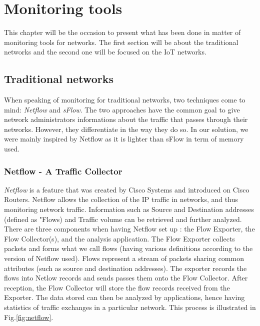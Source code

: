 
\chapter{Monitoring tools}

This chapter will be the occasion to present what has been done in matter of monitoring tools for networks. The first section will be about the traditional networks and the second one will be focused on the IoT networks.

\section{Traditional networks}

When speaking of monitoring for traditional networks, two techniques come to mind: \textit{Netflow} and \textit{sFlow}. The two approaches have the common goal to give network administrators informations about the traffic that passes through their networks. However, they differentiate in the way they do so. In our solution, we were mainly inspired by Netflow as it is lighter than sFlow in term of memory used.

\subsection{Netflow - A Traffic Collector}

\textit{Netflow} is a feature that was created by Cisco Systems and introduced on Cisco Routers. Netflow allows the collection of the IP traffic in networks, and thus monitoring network traffic. Information such as Source and Destination addresses (defined as "Flows) and Traffic volume can be retrieved and further analyzed.\\

There are three components when having Netflow set up : the Flow Exporter, the Flow Collector(s), and the analysis application. The Flow Exporter collects packets and forms what we call flows (having various definitions according to the version of Netflow used). Flows represent a stream of packets sharing common attributes (such as source and destination addresses). The exporter records the flows into Netlow records and sends passes them onto the Flow Collector. After reception, the Flow Collector will store the flow records received from the Exporter. The data stored can then be analyzed by applications, hence having statistics of traffic exchanges in a particular network. This process is illustrated in Fig.\ref{fig:netflow}.\\

